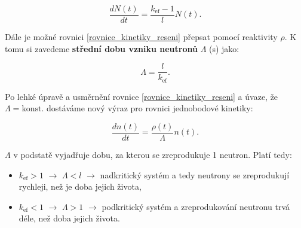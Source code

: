 $$ \dfrac{dN(t)}{dt} = \dfrac{k_{\text{ef}} - 1}{l} N(t). $$

Dále je možné rovnici \eqref{rovnice_kinetiky_reseni} přepsat pomocí reaktivity $\rho$. K tomu si zavedeme \textbf{střední dobu vzniku neutronů} $\Lambda$ (s) jako:

\begin{equation}
  \Lambda = \dfrac{l}{k_{\text{ef}}}.
  \label{stredni_doba_vzniku}
\end{equation}

Po lehké úpravě a usměrnění rovnice \eqref{rovnice_kinetiky_reseni} a úvaze, že $\Lambda = \text{konst.}$ dostáváme nový výraz pro rovnici jednobodové kinetiky:

\begin{equation}
  \dfrac{dn(t)}{dt} = \dfrac{\rho (t)}{\Lambda} n(t).
  \label{rovnice_kinetiky_reaktivita}
\end{equation}

$\Lambda$ v podstatě vyjadřuje dobu, za kterou se zreprodukuje 1 neutron. Platí tedy:

\begin{itemize}
  \item $k_{\text{ef}} > 1$ $\rightarrow$ $\Lambda < l$ $\rightarrow$ nadkritický systém a tedy neutrony se zreprodukují rychleji, než je doba jejich života,
  \item $k_{\text{ef}} < 1$ $\rightarrow$ $\Lambda > 1$ $\rightarrow$ podkritický systém a zreprodukování neutronu trvá déle, než doba jejich života.
\end{itemize}
